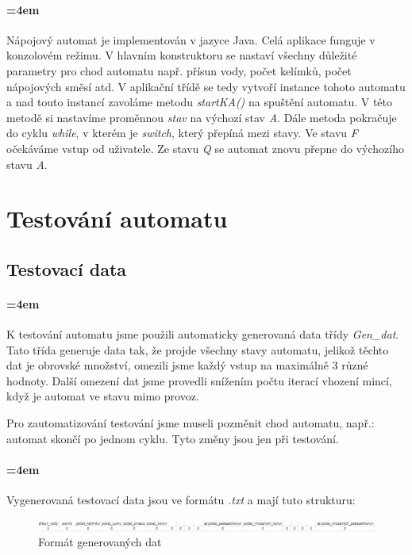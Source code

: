 \documentclass[12pt,a4paper]{article}
\begin{document}
\paragraph{\parindent=4em}{	
	Nápojový automat je implementován v jazyce Java. Celá aplikace funguje v konzolovém režimu. V hlavním konstruktoru se nastaví všechny důležité parametry pro chod automatu např. přísun vody, počet kelímků, počet nápojových směsí atd. V aplikační třídě se tedy vytvoří instance tohoto automatu a nad touto instancí zavoláme metodu {\it startKA()} na spuštění automatu. V této metodě si nastavíme proměnnou {\it stav} na výchozí stav {\it A}. Dále metoda pokračuje do cyklu {\it while}, v kterém je {\it switch}, který přepíná mezi stavy. Ve stavu {\it F} očekáváme vstup od uživatele. Ze stavu {\it Q} se automat znovu přepne do výchozího stavu {\it A}.
}

\section{Testování automatu}

\subsection{Testovací data}

\paragraph{\parindent=4em}{	
	K testování automatu jsme použili automaticky generovaná data třídy {\it Gen\_dat}. Tato třída generuje data tak, že projde všechny stavy automatu, jelikož těchto dat je obrovské množství, omezili jsme každý vstup na maximálně 3 různé hodnoty. Další omezení dat jsme provedli snížením počtu iterací vhození mincí, když je automat ve stavu mimo provoz.
	
	Pro zautomatizování testování jsme museli pozměnit chod automatu, např.: automat skončí po jednom cyklu. Tyto změny jsou jen při testování.
}

\paragraph{\parindent=4em}{	
	Vygenerovaná testovací data jsou ve formátu {\it .txt} a mají tuto strukturu:\\
}

\begin{figure}[H]	
	\centering
	\includegraphics[width=\textwidth]{images/format}
	\caption{Formát generovaných dat}
\end{figure}
\end{document}
